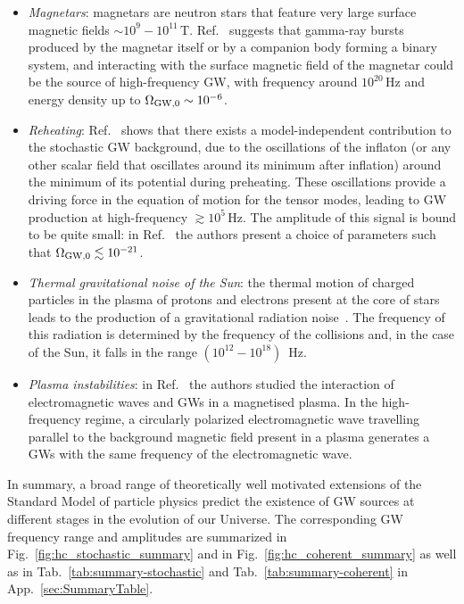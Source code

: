 \documentclass[11pt,a4paper]{article}
\begin{document}
\begin{itemize}
    \item \textit{Magnetars}: magnetars are neutron stars that feature very large surface magnetic fields $\sim 10^9-10^{11} \, \text{T}$. Ref.~\cite{Wen:2017itr} suggests that gamma-ray bursts produced by the magnetar itself or by a companion body forming a binary system, and interacting with the surface magnetic field of the magnetar could be the source of high-frequency GW, with frequency around $10^{20} \, \text{Hz}$ and energy density up to $\Omega_{\rm GW, 0} \sim 10^{-6}$.
    \item \textit{Reheating}: Ref.~\cite{Ema:2020ggo} shows that there exists a model-independent contribution to the stochastic GW background, due to the oscillations of the inflaton (or any other scalar field that oscillates around its minimum after inflation) around the minimum of its potential during preheating. These oscillations provide a driving force in the equation of motion for the tensor modes, leading to GW production at high-frequency $\gtrsim 10^5 \, \text{Hz}$. The amplitude of this signal is bound to be quite small: in Ref.~\cite{Ema:2020ggo} the authors present a choice of parameters such that $\Omega_{\rm GW, 0} \lesssim 10^{-21}$.
    \item \textit{Thermal gravitational noise of  the Sun}: the thermal motion of charged particles in the plasma of protons and electrons present at the core of stars leads to the production of a gravitational radiation noise~\cite{Weinberg:1972kfs, BisnovatyiKogan:2004bk}. The frequency of this radiation is determined by the frequency of the collisions and, in the case of the Sun, it falls in the range $(10^{12}-10^{18})\,$ Hz.
    \item \textit{Plasma instabilities}: in Ref.~\cite{Servin:2003cf} the authors studied the interaction of electromagnetic waves and GWs in a magnetised plasma. In the high-frequency regime, a circularly polarized electromagnetic wave travelling parallel to the background magnetic field present in a plasma generates a GWs with the same frequency of the electromagnetic wave.
\end{itemize}

In summary, a broad range of theoretically well motivated extensions of the Standard Model of particle physics predict the existence of GW sources at different stages in the evolution of our Universe. The corresponding GW frequency range and amplitudes are summarized in Fig.~\ref{fig:hc_stochastic_summary} and in Fig.~\ref{fig:hc_coherent_summary} as well as in Tab.~\ref{tab:summary-stochastic} and Tab.~\ref{tab:summary-coherent} in App.~\ref{sec:SummaryTable}.
\end{document}
